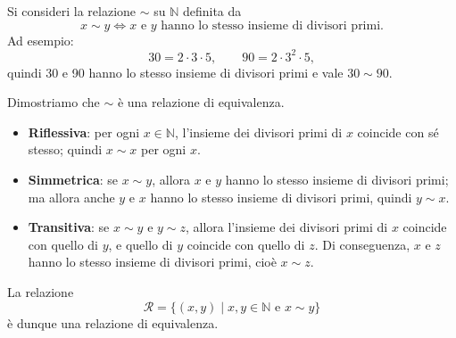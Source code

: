 \begin{esempio}
Si consideri la relazione \(\sim\) su \(\mathbb{N}\) definita da
\[
x \sim y \iff x \text{ e } y \text{ hanno lo stesso insieme di divisori primi}.
\]
Ad esempio:
\[
30 = 2\cdot3\cdot5, \qquad 90 = 2\cdot3^2\cdot5,
\]
quindi 30 e 90 hanno lo stesso insieme di divisori primi e vale \(30 \sim 90\).

Dimostriamo che \(\sim\) è una relazione di equivalenza.

\begin{itemize}
     \item \textbf{Riflessiva}: per ogni \(x \in \mathbb{N}\), l'insieme dei divisori primi di \(x\)
           coincide con sé stesso; quindi \(x \sim x\) per ogni \(x\).
     \item \textbf{Simmetrica}: se \(x \sim y\), allora \(x\) e \(y\) hanno lo stesso insieme di
           divisori primi; ma allora anche \(y\) e \(x\) hanno lo stesso insieme di divisori primi,
           quindi \(y \sim x\).
     \item \textbf{Transitiva}: se \(x \sim y\) e \(y \sim z\), allora l'insieme dei divisori primi
           di \(x\) coincide con quello di \(y\), e quello di \(y\) coincide con quello di \(z\).
           Di conseguenza, \(x\) e \(z\) hanno lo stesso insieme di divisori primi, cioè \(x \sim z\).
\end{itemize}

La relazione
\[
\mathcal{R} = \{ (x,y) \mid x,y \in \mathbb{N} \text{ e } x \sim y\}
\]
è dunque una relazione di equivalenza.
\end{esempio}



























